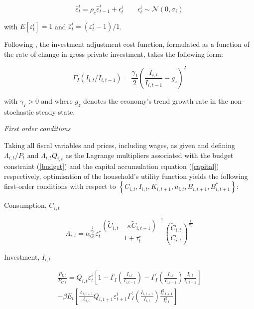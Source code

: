\documentclass[a4paper,11pt]{article}
\numberwithin{equation}{section}
\begin{document}
	\begin{equation*}
		\hat{\varepsilon}^i_t=\rho_c\hat{\varepsilon}^i_{t-1}+\epsilon^i_t \qquad \epsilon^i_t \sim \mathcal{N}(0,\sigma_i)
	\end{equation*}
		
	with $E\left[\varepsilon^i_t\right]=1$ and $\hat{\varepsilon}^i_t=\left(\varepsilon^i_t-1\right)/1$. 
	
	Following \cite{christoffel2008}, the investment adjustment cost function, formulated as a function of the rate of change in gross private investment, takes the following form:
	
	\begin{equation} \label{cap_adj}
	\Gamma_I\left(I_{i,t}/I_{i,t-1}\right)=\frac{\gamma_I}{2}\left(\frac{I_{i,t}}{I_{i,t-1}}-g_z\right)^2
	\end{equation}
	
	with $\gamma_I>0$ and where $g_z$ denotes the economy's trend growth rate in the non-stochastic steady state.
	
	\textit{First order conditions}
	\vspace{8pt}
	
	Taking all fiscal variables and prices, including wages, as given and defining $\Lambda_{i,t}/P_t$ and $\Lambda_{i,t}Q_{i,t}$ as the Lagrange multipliers associated with the budget constraint (\ref{budget}) and the capital accumulation equation (\ref{capital}) respectively, optimisation of the household's utility function yields the following first-order conditions with respect to $\left\{C_{i,t},I_{i,t}, K_{i,t+1},u_{i,t},B_{i,t+1},B^*_{i,t+1}\right\}$:
	
	Consumption, $C_{i,t}$
	
	\begin{equation} \label{foc_c}
	\Lambda_{i,t}=\alpha_G^{\frac{1}{\nu_G}}\varepsilon_t^c\frac{\left(\tilde{C}_{i,t}-\kappa\tilde{C}_{i,t-1}\right)^{-1}}{1+\tau_t^c}\left(\frac{\tilde{C}_{i,t}}{C_{i,t}}\right)^{\frac{1}{\nu_G}}
	\end{equation}
	
	Investment, $I_{i,t}$
	
	\begin{equation} \label{foc_i}
	\begin{split}
	\frac{P_{I,t}}{P_{C,t}}=Q_{i,t}\varepsilon_t^i\left[1-\Gamma_I\left(\frac{I_{i,t}}{I_{i,t-1}}\right)-\Gamma_I^'\left(\frac{I_{i,t}}{I_{i,t-1}}\right)\frac{I_{i,t}}{I_{i,t-1}}\right]\\
	+\beta E_t\left[\frac{\Lambda_{i,t+1}}{\Lambda_{i,t}}Q_{i,t+1}\varepsilon_{t+1}^i\Gamma_I^'\left(\frac{I_{i,t+1}}{I_{i,t}}\right)\frac{I_{i,t+1}^2}{I_{i,t}^2}\right]
	\end{split}
	\end{equation}
	
\end{document}
